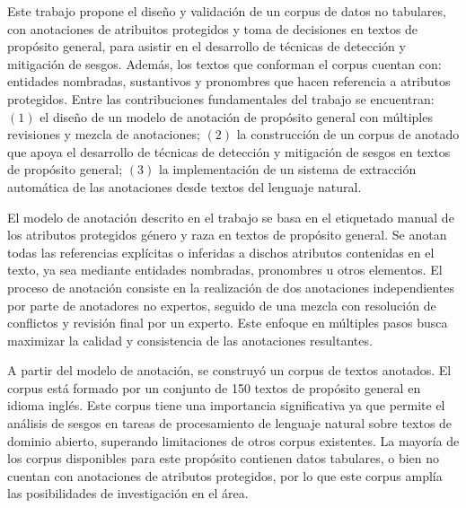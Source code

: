 \begin{conclusions}
    Este trabajo propone el dise\~no y validaci\'on de un corpus de datos no tabulares, con anotaciones de atribuitos
    protegidos y toma de decisiones en textos de prop\'osito general, para asistir en el desarrollo de t\'ecnicas de 
    detecci\'on y mitigaci\'on de sesgos. Adem\'as, los textos que conforman el corpus cuentan con: 
    entidades nombradas, sustantivos y pronombres que hacen referencia a atributos protegidos.
    Entre las contribuciones fundamentales del trabajo se encuentran: $(1)$ el 
    dise\~no de un modelo de anotaci\'on de prop\'osito general con m\'ultiples revisiones y mezcla de anotaciones;
    $(2)$ la construcci\'on de un corpus de anotado que apoya el desarrollo de t\'ecnicas de detecci\'on y mitigaci\'on
    de sesgos en textos de prop\'osito general; $(3)$ la implementaci\'on de un sistema de extracci\'on autom\'atica 
    de las anotaciones desde textos del lenguaje natural.

    El modelo de anotaci\'on descrito en el trabajo se basa en el etiquetado manual de los atributos protegidos g\'enero 
    y raza en textos de prop\'osito general. Se anotan todas las referencias expl\'icitas o inferidas a dischos 
    atributos contenidas en el texto, ya sea mediante entidades nombradas, pronombres u otros elementos. El proceso
    de anotaci\'on consiste en la realizaci\'on de dos anotaciones independientes por parte de anotadores no expertos,
    seguido de una mezcla con resoluci\'on de conflictos y revisi\'on final por un experto. Este enfoque en m\'ultiples 
    pasos busca maximizar la calidad y consistencia de las anotaciones resultantes.

    A partir del modelo de anotaci\'on, se construy\'o un corpus de textos anotados. El corpus est\'a formado por un 
    conjunto de 150 textos de prop\'osito general en idioma ingl\'es. Este corpus tiene una importancia significativa
    ya que permite el an\'alisis de sesgos en tareas de procesamiento de lenguaje natural sobre textos de dominio abierto, 
    superando limitaciones de otros corpus existentes. La mayor\'ia de los corpus disponibles para este prop\'osito
    contienen datos tabulares, o bien no cuentan con anotaciones de atributos protegidos, por lo que este corpus 
    ampl\'ia las posibilidades de investigaci\'on en el \'area.
    

\end{conclusions}
